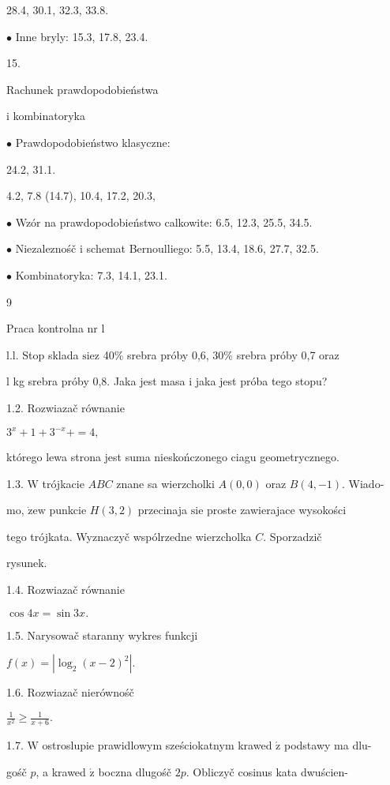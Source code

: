 \documentclass[a4paper,12pt]{article}
\begin{document}
28.4, 30.1, 32.3, 33.8.

$\bullet$ Inne bryly: 15.3, 17.8, 23.4.

15.

Rachunek prawdopodobieństwa

i kombinatoryka

$\bullet$ Prawdopodobieństwo klasyczne:

24.2, 31.1.

4.2, 7.8 (14.7), 10.4, 17.2, 20.3,

$\bullet$ Wzór na prawdopodobieństwo calkowite: 6.5, 12.3, 25.5, 34.5.

$\bullet$ Niezaleznośč $\mathrm{i}$ schemat Bernoulliego: 5.5, 13.4, 18.6, 27.7, 32.5.

$\bullet$ Kombinatoryka: 7.3, 14.1, 23.1.





9

Praca kontrolna nr l

l.l. Stop sklada $\mathrm{s}\mathrm{i}\mathrm{e} \mathrm{z}$ 40\% srebra próby 0,6, 30\% srebra próby 0,7 oraz

l kg srebra próby 0,8. Jaka jest masa $\mathrm{i}$ jaka jest próba tego stopu?

1.2. Rozwiazač równanie

$3^{x}+1+3^{-x}+=4,$

którego lewa strona jest suma nieskończonego ciagu geometrycznego.

1.3. $\mathrm{W}$ trójkacie $ABC$ znane sa wierzcholki $A(0,0)$ oraz $B(4,-1)$. Wiado-

mo, $\dot{\mathrm{z}}\mathrm{e}\mathrm{w}$ punkcie $H(3,2)$ przecinaja $\mathrm{s}\mathrm{i}\mathrm{e}$ proste zawierajace wysokości

tego trójkata. Wyznaczyč wspólrzedne wierzcholka $C$. Sporzadzič

rysunek.

1.4. Rozwiazač równanie

$\cos 4x=\sin 3x.$

1.5. Narysowač staranny wykres funkcji

$f(x)=|\log_{2}(x-2)^{2}|.$

1.6. Rozwiazač nierównośč

$\displaystyle \frac{1}{x^{2}}\geq\frac{1}{x+6}.$

1.7. $\mathrm{W}$ ostroslupie prawidlowym sześciokatnym krawed $\acute{\mathrm{z}}$ podstawy ma dlu-

gośč $p$, a krawed $\acute{\mathrm{z}}$ boczna dlugośč $2p$. Obliczyč cosinus kata dwuścien-
\end{document}
